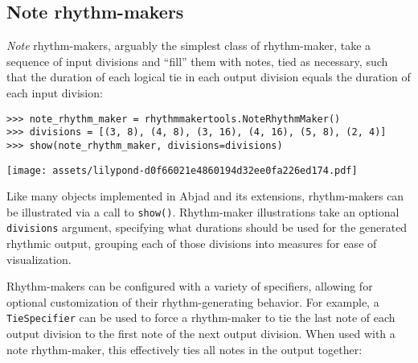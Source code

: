 \subsection{Note rhythm-makers}
\label{ssec:note-rhythm-makers}

\emph{Note} rhythm-makers, arguably the simplest class of rhythm-maker, take a
sequence of input divisions and \enquote{fill} them with notes, tied as
necessary, such that the duration of each logical tie in each output division
equals the duration of each input division:

\begin{comment}
<abjad>
note_rhythm_maker = rhythmmakertools.NoteRhythmMaker()
divisions = [(3, 8), (4, 8), (3, 16), (4, 16), (5, 8), (2, 4)]
show(note_rhythm_maker, divisions=divisions)
</abjad>
\end{comment}

\begin{abjadbookoutput}
\begin{singlespacing}
\vspace{-0.5\baselineskip}
\begin{verbatim}
>>> note_rhythm_maker = rhythmmakertools.NoteRhythmMaker()
>>> divisions = [(3, 8), (4, 8), (3, 16), (4, 16), (5, 8), (2, 4)]
>>> show(note_rhythm_maker, divisions=divisions)
\end{verbatim}
\noindent\texttt{[image: assets/lilypond-d0f66021e4860194d32ee0fa226ed174.pdf]}
\end{singlespacing}
\end{abjadbookoutput}

\noindent Like many objects implemented in Abjad and its extensions,
rhythm-makers can be illustrated via a call to \texttt{show()}. Rhythm-maker
illustrations take an optional \texttt{divisions} argument, specifying what
durations should be used for the generated rhythmic output, grouping each of
those divisions into measures for ease of visualization.

Rhythm-makers can be configured with a variety of specifiers, allowing for
optional customization of their rhythm-generating behavior. For example, a
\texttt{TieSpecifier} can be used to force a rhythm-maker to tie the last note
of each output division to the first note of the next output division. When
used with a note rhythm-maker, this effectively ties all notes in the output
together:

\begin{comment}
<abjad>
note_rhythm_maker = new(
    note_rhythm_maker,
    tie_specifier=rhythmmakertools.TieSpecifier(
        tie_across_divisions=True,
        ),
    )
show(note_rhythm_maker, divisions=divisions)
</abjad>
\end{comment}

